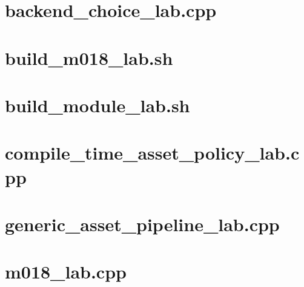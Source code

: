 \documentclass[11pt,twoside,openany]{book}
\begin{document}
\section*{backend\_choice\_lab.cpp}
\hypertarget{source-file-c936569afa19be638ec87991}{}
\label{attachmentstart:source-file-c936569afa19be638ec87991}
\section*{build\_m018\_lab.sh}
\hypertarget{source-file-e1b7c3e4f52da0e7c9c36a41}{}
\label{attachmentstart:source-file-e1b7c3e4f52da0e7c9c36a41}
\section*{build\_module\_lab.sh}
\hypertarget{source-file-f5eb017280bb6b2ae6b1475d}{}
\label{attachmentstart:source-file-f5eb017280bb6b2ae6b1475d}
\section*{compile\_time\_asset\_policy\_lab.cpp}
\hypertarget{source-file-a5db53514d74ae247b4ac42f}{}
\label{attachmentstart:source-file-a5db53514d74ae247b4ac42f}
\section*{generic\_asset\_pipeline\_lab.cpp}
\hypertarget{source-file-8aedc3fdcd10c91971507448}{}
\label{attachmentstart:source-file-8aedc3fdcd10c91971507448}
\section*{m018\_lab.cpp}
\hypertarget{source-file-552a9e2296dc984412c8f06d}{}
\label{attachmentstart:source-file-552a9e2296dc984412c8f06d}
\end{document}
